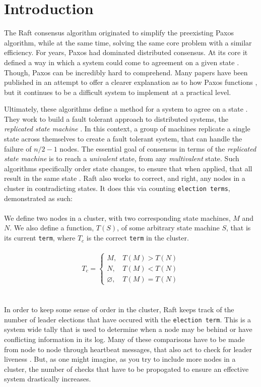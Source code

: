 \section{Introduction}

The Raft consensus algorithm originated to simplify the 
preexisting Paxos algorithm, while at the same time, 
solving the same core problem \cite{OngaroRaft} with a 
similar efficiency. For years, Paxos had dominated 
distributed consensus. At its core it defined a way in 
which a system could come to agreement on a given state 
\cite{LamportPPT}. Though, Paxos can be incredibly hard 
to comprehend. Many papers have been published in an 
attempt to offer a clearer explanation as to how Paxos 
functions \cite{LamportSimple, MazieresPractical}, but it 
continues to be a difficult system to implement at a 
practical level.

Ultimately, these algorithms define a method for a system to agree on a state \cite{BrandFSM}. They work to build a fault tolerant approach to distributed systems, the \textit{replicated state machine} \cite{SchneiderFSM}. In this context, a group of machines replicate a single state across themselves to create a fault tolerant system, that can handle the failure of $n/2 - 1$ nodes. The essential goal of consensus in terms of the \textit{replicated state machine} is to reach a \textit{univalent} state, from any \textit{multivalent} state. Such algorithms specifically order state changes, to ensure that when applied, that all result in the same state \cite{OngaroRaft, LamportTime}. Raft also works to correct, and right, any nodes in a cluster in contradicting states. It does this via counting \texttt{election terms}, demonstrated as such:
\\
\\
We define two nodes in a cluster, with two corresponding state machines, $M$ and $N$. We also define a function, $T(S)$, of some arbitrary state machine $S$, that is its current \texttt{term}, where $T_{c}$ is the correct \texttt{term} in the cluster.
\\
\\
$$
T_{c} =
\begin{cases}
M, & T(M) > T(N)\\
N, & T(M) < T(N)\\
\varnothing, & T(M) = T(N)
\end{cases}
$$
\\
\\
In order to keep some sense of order in the cluster, Raft keeps track of the number of leader elections that have occured with the \texttt{election term}. This is a system wide tally that is used to determine when a node may be behind or have conflicting information in its log.
Many of these comparisons have to be made from node to node through heartbeat messages, that also act to check for leader liveness \cite{OngaroRaft}. But, as one might imagine, as you try to include more nodes in a cluster, the number of checks that have to be propogated to ensure an effective system drastically increases.